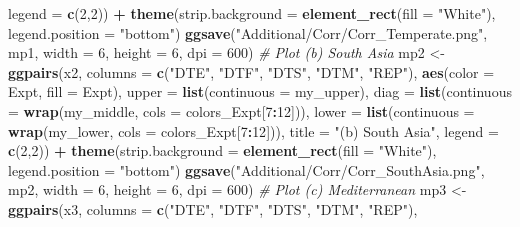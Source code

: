 \documentclass[
]{article}
\newenvironment{Shaded}{\begin{snugshade}}{\end{snugshade}}
\newcommand{\CommentTok}[1]{\textcolor[rgb]{0.56,0.35,0.01}{\textit{#1}}}
\newcommand{\DataTypeTok}[1]{\textcolor[rgb]{0.13,0.29,0.53}{#1}}
\newcommand{\DecValTok}[1]{\textcolor[rgb]{0.00,0.00,0.81}{#1}}
\newcommand{\KeywordTok}[1]{\textcolor[rgb]{0.13,0.29,0.53}{\textbf{#1}}}
\newcommand{\NormalTok}[1]{#1}
\newcommand{\OperatorTok}[1]{\textcolor[rgb]{0.81,0.36,0.00}{\textbf{#1}}}
\newcommand{\StringTok}[1]{\textcolor[rgb]{0.31,0.60,0.02}{#1}}
\begin{document}
\begin{Shaded}
\begin{Highlighting}[]
{{{{{        \DataTypeTok{legend =} \KeywordTok{c}\NormalTok{(}\DecValTok{2}\NormalTok{,}\DecValTok{2}\NormalTok{)) }\OperatorTok{+}
\StringTok{  }\KeywordTok{theme}\NormalTok{(}\DataTypeTok{strip.background =} \KeywordTok{element_rect}\NormalTok{(}\DataTypeTok{fill =} \StringTok{"White"}\NormalTok{),}
        \DataTypeTok{legend.position =} \StringTok{"bottom"}\NormalTok{)}
\KeywordTok{ggsave}\NormalTok{(}\StringTok{"Additional/Corr/Corr_Temperate.png"}\NormalTok{, mp1, }\DataTypeTok{width =} \DecValTok{6}\NormalTok{, }\DataTypeTok{height =} \DecValTok{6}\NormalTok{, }\DataTypeTok{dpi =} \DecValTok{600}\NormalTok{)}
\CommentTok{# Plot (b) South Asia}
\NormalTok{mp2 <-}\StringTok{ }\KeywordTok{ggpairs}\NormalTok{(x2, }\DataTypeTok{columns =} \KeywordTok{c}\NormalTok{(}\StringTok{"DTE"}\NormalTok{, }\StringTok{"DTF"}\NormalTok{, }\StringTok{"DTS"}\NormalTok{, }\StringTok{"DTM"}\NormalTok{, }\StringTok{"REP"}\NormalTok{), }
               \KeywordTok{aes}\NormalTok{(}\DataTypeTok{color =}\NormalTok{ Expt, }\DataTypeTok{fill =}\NormalTok{ Expt),}
        \DataTypeTok{upper  =} \KeywordTok{list}\NormalTok{(}\DataTypeTok{continuous =}\NormalTok{ my_upper),}
        \DataTypeTok{diag   =} \KeywordTok{list}\NormalTok{(}\DataTypeTok{continuous =} \KeywordTok{wrap}\NormalTok{(my_middle, }\DataTypeTok{cols =}\NormalTok{ colors_Expt[}\DecValTok{7}\OperatorTok{:}\DecValTok{12}\NormalTok{])),}
        \DataTypeTok{lower  =} \KeywordTok{list}\NormalTok{(}\DataTypeTok{continuous =} \KeywordTok{wrap}\NormalTok{(my_lower,  }\DataTypeTok{cols =}\NormalTok{ colors_Expt[}\DecValTok{7}\OperatorTok{:}\DecValTok{12}\NormalTok{])),}
        \DataTypeTok{title  =} \StringTok{"(b) South Asia"}\NormalTok{, }
        \DataTypeTok{legend =} \KeywordTok{c}\NormalTok{(}\DecValTok{2}\NormalTok{,}\DecValTok{2}\NormalTok{)) }\OperatorTok{+}
\StringTok{  }\KeywordTok{theme}\NormalTok{(}\DataTypeTok{strip.background =} \KeywordTok{element_rect}\NormalTok{(}\DataTypeTok{fill =} \StringTok{"White"}\NormalTok{),}
        \DataTypeTok{legend.position =} \StringTok{"bottom"}\NormalTok{)}
\KeywordTok{ggsave}\NormalTok{(}\StringTok{"Additional/Corr/Corr_SouthAsia.png"}\NormalTok{, mp2, }\DataTypeTok{width =} \DecValTok{6}\NormalTok{, }\DataTypeTok{height =} \DecValTok{6}\NormalTok{, }\DataTypeTok{dpi =} \DecValTok{600}\NormalTok{)}
\CommentTok{# Plot (c) Mediterranean}
\NormalTok{mp3 <-}\StringTok{ }\KeywordTok{ggpairs}\NormalTok{(x3, }\DataTypeTok{columns =} \KeywordTok{c}\NormalTok{(}\StringTok{"DTE"}\NormalTok{, }\StringTok{"DTF"}\NormalTok{, }\StringTok{"DTS"}\NormalTok{, }\StringTok{"DTM"}\NormalTok{, }\StringTok{"REP"}\NormalTok{), }
}}}}}
\end{Highlighting}
\end{Shaded}
\end{document}
